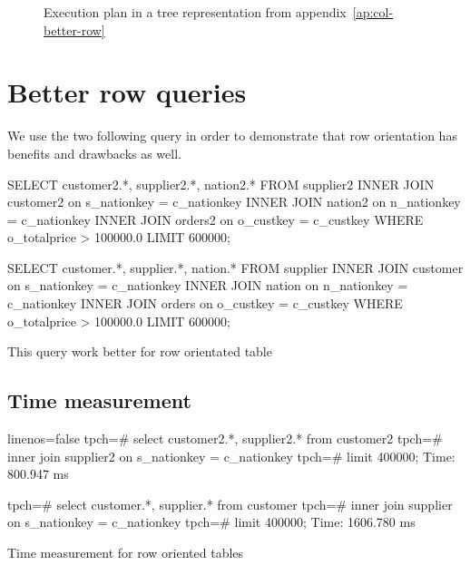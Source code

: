 \documentclass[a4paper,11pt]{report}
\begin{document}
\begin{figure}[H]
  \centering
  \caption{Execution plan in a tree representation from appendix~\ref{ap:col-better-row}}
  \label{fig:col-better-row} 
\end{figure}


\newpage

\section*{Better row queries}

We use the two following query in order to demonstrate that row orientation
has benefits and drawbacks as well.

\begin{listing}[H]
\centering
\begin{sqlcode}
SELECT customer2.*, supplier2.*, nation2.* FROM supplier2
    INNER JOIN customer2 on s_nationkey = c_nationkey
    INNER JOIN nation2 on n_nationkey = c_nationkey
    INNER JOIN orders2 on o_custkey = c_custkey
    WHERE o_totalprice > 100000.0
    LIMIT 600000;

SELECT customer.*, supplier.*, nation.* FROM supplier
    INNER JOIN customer on s_nationkey = c_nationkey
    INNER JOIN nation on n_nationkey = c_nationkey
    INNER JOIN orders on o_custkey = c_custkey
    WHERE o_totalprice > 100000.0
    LIMIT 600000;
\end{sqlcode}
\caption{This query work better for row orientated table}
\label{lst:best-col-query}
\end{listing}

\subsection*{Time measurement}

\begin{listing}[H]
\centering
\begin{sqlcode*}{linenos=false}
tpch=# select customer2.*, supplier2.* from customer2
tpch=#     inner join supplier2 on s_nationkey = c_nationkey
tpch=#     limit 400000;
Time: 800.947 ms

tpch=# select customer.*, supplier.* from customer
tpch=#     inner join supplier on s_nationkey = c_nationkey
tpch=#     limit 400000;
Time: 1606.780 ms
\end{sqlcode*}
\caption{Time measurement for row oriented tables}
\label{lst:time-row}
\end{listing}
\end{document}
